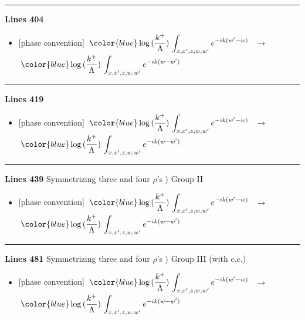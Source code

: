 \documentclass[10pt]{article}
\begin{document}
\noindent\rule{\linewidth}{0.3pt}\par\noindent\textbf{Lines 404} \par
\begin{itemize}[leftmargin=2.2em,itemsep=1pt,topsep=2pt]
\item[\textbf{l.404}] \textsf{\small [phase convention]} $\displaystyle \,{\color{blue}\log{(\frac{k^{+}}{\Lambda})}}\,\int_{x,x',z,w,w'}e^{-ik(w'-w)}\,$\ $\longrightarrow$\ $\displaystyle \,{\color{blue}\log{(\frac{k^{+}}{\Lambda})}}\,\int_{x,x',z,w,w'}e^{-ik(w-w')}\,$
\end{itemize}
\noindent\rule{\linewidth}{0.3pt}\par\noindent\textbf{Lines 419} \par
\begin{itemize}[leftmargin=2.2em,itemsep=1pt,topsep=2pt]
\item[\textbf{l.419}] \textsf{\small [phase convention]} $\displaystyle \,{\color{blue}\log{(\frac{k^{+}}{\Lambda})}}\,\int_{x,x',z,w,w'}e^{-ik(w'-w)}\,$\ $\longrightarrow$\ $\displaystyle \,{\color{blue}\log{(\frac{k^{+}}{\Lambda})}}\,\int_{x,x',z,w,w'}e^{-ik(w-w')}\,$
\end{itemize}
\noindent\rule{\linewidth}{0.3pt}\par\noindent\textbf{Lines 439} \quad \textsf{Symmetrizing three and four $\rho$'s $\rangle$ Group II} \par
\begin{itemize}[leftmargin=2.2em,itemsep=1pt,topsep=2pt]
\item[\textbf{l.439}] \textsf{\small [phase convention]} $\displaystyle \,{\color{blue}\log{(\frac{k^{+}}{\Lambda})}}\,\int_{x,x',z,w,w'}e^{-ik(w'-w)}\,$\ $\longrightarrow$\ $\displaystyle \,{\color{blue}\log{(\frac{k^{+}}{\Lambda})}}\,\int_{x,x',z,w,w'}e^{-ik(w-w')}\,$
\end{itemize}
\noindent\rule{\linewidth}{0.3pt}\par\noindent\textbf{Lines 481} \quad \textsf{Symmetrizing three and four $\rho$'s $\rangle$ Group III (with c.c.)} \par
\begin{itemize}[leftmargin=2.2em,itemsep=1pt,topsep=2pt]
\item[\textbf{l.481}] \textsf{\small [phase convention]} $\displaystyle \,{\color{blue}\log{(\frac{k^{+}}{\Lambda})}}\,\int_{x,x',z,w,w'}e^{-ik(w'-w)}\,$\ $\longrightarrow$\ $\displaystyle \,{\color{blue}\log{(\frac{k^{+}}{\Lambda})}}\,\int_{x,x',z,w,w'}e^{-ik(w-w')}\,$
\end{itemize}
\end{document}
